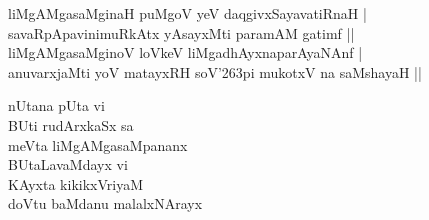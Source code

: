 \begin{entry}
\begin{shl}
liMgAMgasaMginaH puMgoV yeV daqgivxSayavatiRnaH |\\
savaRpApavinimuRkAtx yAsayxMti paramAM gatimf ||\\
liMgAMgasaMginoV loVkeV liMgadhAyxnaparAyaNAnf |\\
anuvarxjaMti yoV matayxRH soV{\char'263}pi mukotxV na saMshayaH ||
\end{shl}
\end{entry}

\begin{entry}
\begin{shl}
nUtana pUta vi\\
BUti rudArxkaSx sa\\
meVta liMgAMgasaMpananx\\
BUtaLavaMdayx vi\\
KAyxta kikikxVriyaM\\
doVtu baMdanu malalxNArayx
\end{shl}
\end{entry}

